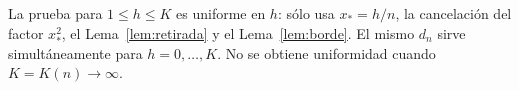 \begin{observacion}
La prueba para $1\le h\le K$ es uniforme en $h$: sólo usa $x_*=h/n$, la cancelación del factor
$x_*^2$, el Lema~\ref{lem:retirada} y el Lema~\ref{lem:borde}. El mismo $d_n$ sirve
simultáneamente para $h=0,\dots,K$. No se obtiene uniformidad cuando $K=K(n)\to\infty$.
\end{observacion}
